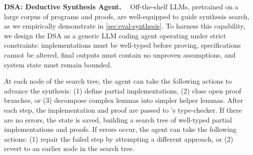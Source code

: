 \textbf{DSA: Deductive Synthesis Agent. \ }
\label{sec:design-worker}
Off-the-shelf LLMs, pretrained on a large corpus of programs and proofs, are well-equipped to guide synthesis search,
as we empirically demonstrate in \cref{sec:eval-synthesis}. To harness this capability, we design the DSA as a generic LLM coding agent operating under strict constraints: implementations must be well-typed before proving, specifications cannot be altered, final outputs must contain no unproven assumptions, and system state must remain bounded.

% 

At each node of the search tree, the agent can take the following actions to advance the synthesis: (1) define partial implementations, (2) close open proof branches, or (3) decompose complex lemmas into simpler helper lemmas. After each step, the implementation and proof are passed to \coq{}'s type-checker. If there are no errors, the state is saved, building a search tree of well-typed partial implementations and proofs. If errors occur, the agent can take the following actions: (1) repair the failed step by attempting a different approach, or (2) revert to an earlier node in the search tree.

